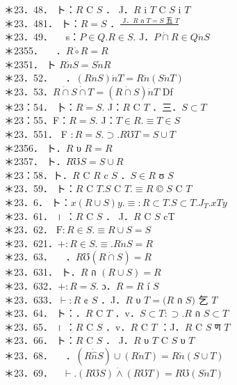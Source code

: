 \documentclass[10pt]{article}
\begin{document}
＊23．48． ト：$R$ C $S$ ． J．$R$ i $T$ C $S$ i $T$\\
＊23．481． ト：$R=S$ ．$\frac{\text { J．} R \text { ก } T=S \text { 五 } T}{}$\\
＊23．49．$\quad$ s：$P \in Q . R \in S$. J．$P \dot{\cap} R \in Q \dot{n} S$\\
＊2355．$\quad$ ．$R \dot{\circ} R=R$\\
＊2351． ト $R \dot{n} S=S \dot{n} R$\\
＊23．52．$\quad$ ．$(R \dot{n} S) \dot{n} T=R \dot{n}(S \dot{n} T)$\\
＊23．53．$R \dot{\cap} S \dot{\cap} T=(R \dot{\cap} S) \dot{n} T$ Df\\
＊23：54． 卜：$R=S$. J：$R$ C $T$ ．三．$S \subset T$\\
＊23：55．F：$R=S$. J：$T \in R . \equiv T \in S$\\
＊23．551． F $: R=S . \supset . R \mho T=S \cup T$\\
＊2356． ト．$R$ υ $R=R$\\
＊2357． ト．$R \mho S=S \cup R$\\
＊23：58．ト．$R$ C $R$ c $S$ ．$S \in R$ ʊ $S$\\
＊23．59． ト：$R$ C $T . S$ C $T . \equiv R$ © $S$ C $T$\\
＊23．6． ト：$x(R \cup S) y . \equiv: R \subset T . S \subset T . J_{T} . x T y$\\
＊23．61． । ：$R$ C $S$ ． J．$R$ C $S$ cT\\
＊23．62． $\mathrm{F}: R \in S . \equiv R \cup S=S$\\
＊23．621．$+: R \in S . \equiv . R \dot{n} S=R$\\
＊23．63．$\quad$ ．$R \mho(R \dot{\cap} S)=R$\\
＊23．631． ト．$R$ ก $(R \cup S)=R$\\
＊23．632．$+: R=S$. ɔ．$R=R$ í $S$\\
＊23．633．$\vdash: R$ ¢ $S$ ．J．$R$ υ $T=(R$ ก $S)$ 乞 $T$\\
＊23．64． ト：．$R$ C $T$ ．v．$S \subset T: \supset . R$ ก $S \subset T$\\
＊23．65． । ：$R$ C $S$ ．v．$R$ C $T$ ：J．$R$ C $S$ ण $T$\\
＊23．66． ト：$R$ C $S$ ． J．$R$ υ $T$ C $S$ υ $T$\\
＊23．68．$\quad$ ．$(R \dot{\hat{n}} S) \cup(R \dot{n} T)=R \dot{n}(S \cup T)$\\
＊23．69．$\quad \vdash .(R \mho S) \dot{\wedge}(R \mho T)=R \mho(S \dot{n} T)$\\
\end{document}
